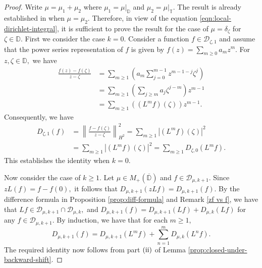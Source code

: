 \documentclass[10pt,oneside,reqno]{amsart}
\theoremstyle{definition}
\theoremstyle{remark}
\newcommand{\norm}[1]{\left\lVert #1 \right\rVert}
\newcommand{\abs}[1]{\left\lvert #1 \right\rvert}
\renewcommand{\ge}{\geqslant}
\newcommand{\D}{\mathbb D}
\newcommand{\T}{\mathbb T}
\numberwithin{equation}{section}
\begin{document}
\begin{proof}
Write $\mu=\mu_1+\mu_2$ where $\mu_1 = \mu |_{\D}$ and $\mu_2 = \mu |_{\T}$. The result is already established in \cite[Lemma 2.10 and Corollary 3.3]{GGR22} when $\mu=\mu_2.$ Therefore, in view of the equation \eqref{eqn:local-dirichlet-integral}, it is sufficient to prove the result for the case of $\mu=\delta_{\zeta}$ for $\zeta\in\D.$ First we consider the case $k=0$.  Consider a function $f\in \mathscr D_{\zeta,1}$ and assume that the power series representation of $f$ is given by $f\left( z \right) = \sum_{m \ge 0} a_m z^m$. For $z, \zeta\in\mathbb D,$ we have
    \begin{align*}
	\frac{f\left( z \right) - f\left( \zeta \right)}{z-\zeta} 
	&= \sum_{m\ge 1} \left( a_{m} \sum_{j=0}^{m-1} z^{m-1-j} \zeta ^{j} \right) \\
	&=\sum_{m\ge 1} \left( \sum_{j\ge m} a_{j} \zeta^{j-m} \right) z^{m-1}  \\
	&= \sum_{m\ge 1} \left(\left( L^{m}f \right) \left( \zeta \right)\right) z^{m-1}.
    \end{align*}
    Consequently, we have 
    \begin{align*}
	D_{\zeta, 1} \left( f \right) &= \norm{\frac{f-f\left( \zeta \right)}{z-\zeta}}_{H^{2}}^{2} = \sum_{m\ge 1} \abs{\left( L^{m}f \right) \left( \zeta \right)}^{2} \\
    &= \sum_{m\ge 1} \abs{\left( L^{m}f \right) \left( \zeta \right)}^{2}
    = \sum_{m\ge 1} D_{\zeta, 0} \left( L^{m}f \right).
    \end{align*}
   This establishes the identity when $k=0.$ 
   
   Now consider the case of $k\ge1$. Let $\mu\in M_+(\overline{\D})$ and $f\in \mathscr D_{\mu,k+1}.$ Since $zL(f) = f-f\left( 0 \right),$ it follows that $D_{\mu, k+1} \left( zLf \right)= D_{\mu,k+1} \left( f \right).$ By the difference formula in Proposition \ref{prop:diff-formula} and Remark \ref{zf vs f}, we have that $Lf\in \mathscr D_{\mu,k+1} \cap  \mathscr D_{\mu,k},$ and 
   $D_{\mu, k+1} \left( f \right) = D_{\mu,k+1} \left( Lf \right) + D_{\mu, k} \left( Lf \right)$ for any $f \in \mathscr D _{\mu, k+1}$. By induction, we have that for each $m \ge 1$,
    \begin{equation*}
	D_{\mu, k+1} \left( f \right) = D_{\mu, k+1} \left( L^{m}f \right) + \sum_{n=1}^{m} D_{\mu, k} \left( L^{n}f \right).
    \end{equation*}
The required identity now follows from part $\rm(ii)$ of Lemma \ref{prop:closed-under-backward-shift}.
\end{proof}
\end{document}
